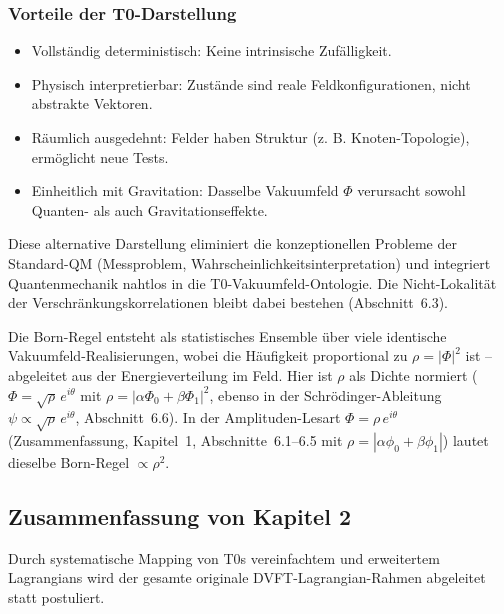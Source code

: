 	\subsubsection{Vorteile der T0-Darstellung}
	
	\begin{itemize}
		\item Vollständig deterministisch: Keine intrinsische Zufälligkeit.
		\item Physisch interpretierbar: Zustände sind reale Feldkonfigurationen, nicht abstrakte Vektoren.
		\item Räumlich ausgedehnt: Felder haben Struktur (z. B. Knoten-Topologie), ermöglicht neue Tests.
		\item Einheitlich mit Gravitation: Dasselbe Vakuumfeld $\Phi$ verursacht sowohl Quanten- als auch Gravitationseffekte.
	\end{itemize}
	
	Diese alternative Darstellung eliminiert die konzeptionellen Probleme der Standard-QM (Messproblem, Wahrscheinlichkeitsinterpretation) und integriert Quantenmechanik nahtlos in die T0-Vakuumfeld-Ontologie. Die Nicht-Lokalität der Verschränkungskorrelationen bleibt dabei bestehen (Abschnitt~6.3).
	
	Die Born-Regel entsteht als statistisches Ensemble über viele identische Vakuumfeld-Realisierungen, wobei die Häufigkeit proportional zu $\rho = |\Phi|^2$ ist – abgeleitet aus der Energieverteilung im Feld. Hier ist $\rho$ als Dichte normiert ($\Phi = \sqrt{\rho}\,e^{i\theta}$ mit $\rho = |\alpha\Phi_0 + \beta\Phi_1|^2$, ebenso in der Schrödinger-Ableitung $\psi \propto \sqrt{\rho}\,e^{i\theta}$, Abschnitt~6.6). In der Amplituden-Lesart $\Phi = \rho\,e^{i\theta}$ (Zusammenfassung, Kapitel~1, Abschnitte~6.1--6.5 mit $\rho = |\alpha\phi_0 + \beta\phi_1|$) lautet dieselbe Born-Regel $\propto \rho^2$.
	
	\subsection{Zusammenfassung von Kapitel 2}
	
	Durch systematische Mapping von T0s vereinfachtem und erweitertem Lagrangians wird der gesamte originale DVFT-Lagrangian-Rahmen abgeleitet statt postuliert.
	
